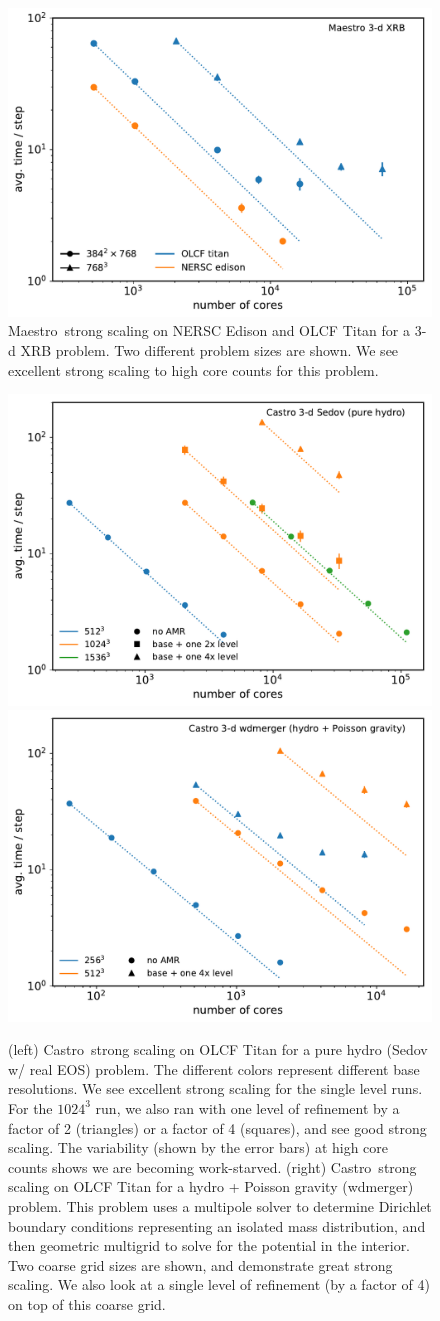 \documentclass[a4paper]{jpconf}
\newcommand{\maestro}{{\sffamily Maestro}}
\newcommand{\castro}{{\sffamily Castro}}
\begin{document}
\begin{figure}[t]
\centering
\includegraphics[width=0.48\linewidth]{titan_edison_maestro_scaling}
\begin{minipage}[b]{0.48\linewidth}
\caption{\label{fig:maestro_scaling} \maestro\ strong scaling on NERSC
  Edison and OLCF Titan for a 3-d XRB problem.  Two different problem
  sizes are shown.  We see excellent strong scaling to high core counts
  for this problem.\vspace{2em}}
\end{minipage}
\end{figure}

\begin{figure}[t]
\centering
\includegraphics[width=0.48\linewidth]{sedov_scaling}
\includegraphics[width=0.48\linewidth]{wdmerger_scaling}
\caption{\label{fig:castro-scaling} (left) \castro\ strong scaling on
  OLCF Titan for a pure hydro (Sedov w/ real EOS) problem.  The
  different colors represent different base resolutions.  We see
  excellent strong scaling for the single level runs.  For the
  $1024^3$ run, we also ran with one level of refinement by a factor
  of 2 (triangles) or a factor of 4 (squares), and see good strong
  scaling.  The variability (shown by the error bars) at high core
  counts shows we are becoming work-starved. (right) \castro\ strong
  scaling on OLCF Titan for a hydro + Poisson gravity (wdmerger)
  problem.  This problem uses a multipole solver to determine
  Dirichlet boundary conditions representing an isolated mass
  distribution, and then geometric multigrid to solve for the
  potential in the interior.  Two coarse grid sizes are shown, and
  demonstrate great strong scaling.  We also look at a single level of
  refinement (by a factor of 4) on top of this coarse grid.}
\end{figure}
\end{document}
